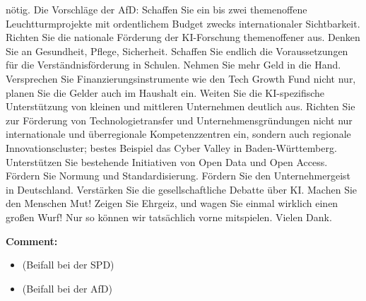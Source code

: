 \documentclass{article}
\begin{document}
nötig. Die Vorschläge der AfD: Schaffen Sie ein bis zwei themenoffene Leuchtturmprojekte mit ordentlichem Budget zwecks internationaler Sichtbarkeit. Richten Sie die nationale Förderung der KI-Forschung themenoffener aus. Denken Sie an Gesundheit, Pflege, Sicherheit. Schaffen Sie endlich die Voraussetzungen für die Verständnisförderung in Schulen. Nehmen Sie mehr Geld in die Hand. Versprechen Sie Finanzierungsinstrumente wie den Tech Growth Fund nicht nur, planen Sie die Gelder auch im Haushalt ein. Weiten Sie die KI-spezifische Unterstützung von kleinen und mittleren Unternehmen deutlich aus.  Richten Sie zur Förderung von Technologietransfer und Unternehmensgründungen nicht nur internationale und überregionale Kompetenzzentren ein, sondern auch regionale Innovationscluster; bestes Beispiel das Cyber Valley in Baden-Württemberg. Unterstützen Sie bestehende Initiativen von Open Data und Open Access. Fördern Sie Normung und Standardisierung. Fördern Sie den Unternehmergeist in Deutschland. Verstärken Sie die gesellschaftliche Debatte über KI. Machen Sie den Menschen Mut! Zeigen Sie Ehrgeiz, und wagen Sie einmal wirklich einen großen Wurf! Nur so können wir tatsächlich vorne mitspielen. Vielen Dank.  

\noindent\textbf{Comment:}
\begin{itemize}
    \setlength\itemsep{-3pt}
    \item (Beifall bei der SPD)
    \setlength\itemsep{-3pt}
    \item (Beifall bei der AfD)
\end{itemize}
\end{document}
